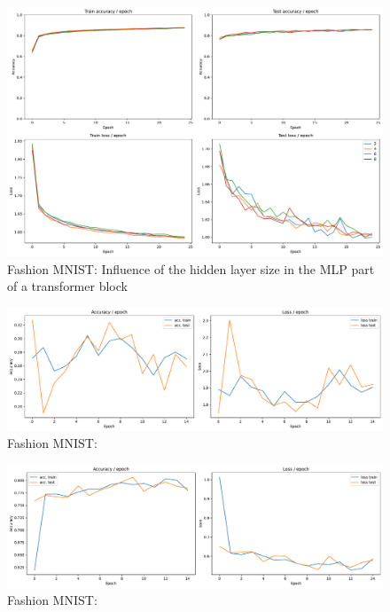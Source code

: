 \begin{figure}[H]
    \centering
    \includegraphics*[width=\textwidth]{figs/Transformers/fashion-MNIST/mlp_ratio_influence_25.pdf}
    \caption{Fashion MNIST: Influence of the hidden layer size in the MLP part of a transformer block}
    \label{fig:fashion:mlp_ratio_influence}
\end{figure}

\begin{figure}[H]
    \centering
    \includegraphics*[width=\textwidth]{figs/Transformers/fashion-MNIST/stats_vit_15.pdf}
    \caption{Fashion MNIST: }
    \label{fig:fashion:stats_vit}
\end{figure}

\begin{figure}[H]
    \centering
    \includegraphics*[width=\textwidth]{figs/Transformers/fashion-MNIST/stats_vit_pretrained_15.pdf}
    \caption{Fashion MNIST: }
    \label{fig:fashion:stats_vit_pretrained}
\end{figure}